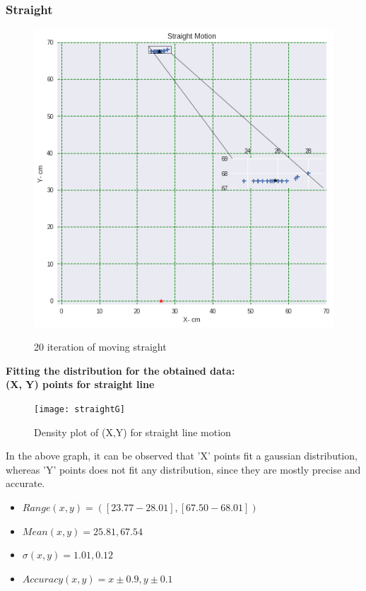 \documentclass[11pt,a4paper]{article}
\begin{document}
\begin{itemize}
\subsubsection{Straight}
\begin{figure}[H]
\centering	
\includegraphics[width=1.2\linewidth]{Straight}
\label{fig:straight}
\caption{20 iteration of moving straight}
\end{figure}

\newpage
\textbf{Fitting the distribution for the obtained data: \\ (X, Y) points for straight line}
\begin{figure}[H]
\centering	
\texttt{[image: straightG]}
\label{fig:straightG}
\caption{Density plot of (X,Y) for straight line motion}
\end{figure}

In the above graph, it can be observed that 'X' points fit a gaussian distribution, whereas 'Y' points does not fit any distribution, since they are mostly precise and accurate.
\begin{itemize}
\item $ Range (x,y) =([23.77-28.01],[67.50-68.01]) $
\item $ Mean (x, y) = 25.81,67.54$
\item $ \sigma (x, y)= 1.01, 0.12 $
\item $ Accuracy (x,y) = x \pm0.9  , y \pm0.1 $  
\end{itemize}


\end{itemize}
\end{document}
